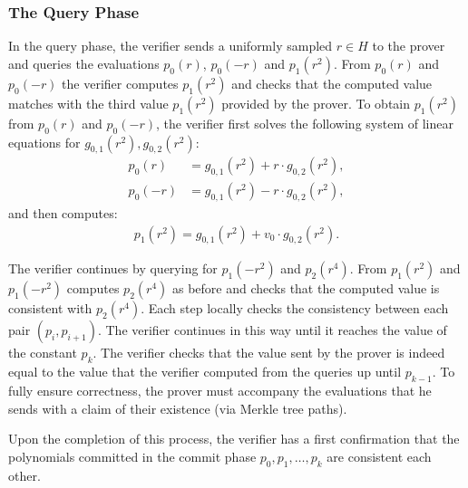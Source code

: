 \subsubsection*{The Query Phase}

In the query phase, the verifier sends a uniformly sampled $r \in H$ to the prover and queries the evaluations $p_0(r)$, $p_0(-r)$ and $p_1(r^2)$. From $p_0(r)$ and $p_0(-r)$ the verifier computes $p_1(r^2)$ and checks that the computed value matches with the third value $p_1(r^2)$ provided
by the prover.
To obtain $p_1(r^2)$ from $p_0(r)$ and $p_0(-r)$, the verifier first solves the following system of linear equations for $g_{0,1}(r^2),g_{0,2}(r^2)$:
\begin{align*}
  p_0(r) &= g_{0,1}(r^2) + r \cdot g_{0,2}(r^2), \\
  p_0(-r) &= g_{0,1}(r^2) - r \cdot g_{0,2}(r^2),
\end{align*}
and then computes: 
\begin{align*}
  p_1(r^2) = g_{0,1}(r^2) + v_0 \cdot g_{0,2}(r^2).
\end{align*}

The verifier continues by querying for $p_1(-r^2)$ and $p_2(r^4)$. From $p_1(r^2)$ and $p_1(-r^2)$ computes $p_2(r^4)$ as before and checks that the computed value is consistent with $p_2(r^4)$. Each step locally checks the consistency between each pair $(p_i,p_{i+1})$.
The verifier continues in this way until it reaches the value of the constant $p_k$. The verifier checks that the value sent by the prover is indeed equal to the value that the verifier computed from the queries up until $p_{k-1}$. To fully ensure correctness, the prover must accompany the evaluations that he sends with a claim of their existence (via Merkle tree paths). 

Upon the completion of this process, the verifier has a first confirmation that the polynomials committed in the commit phase $p_0,p_1,\dots,p_k$ are consistent each other. 

